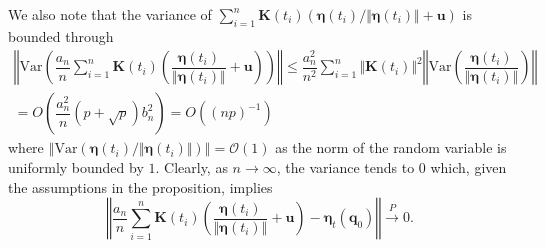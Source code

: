 \documentclass[aos]{imsart}
\theoremstyle{plain}
\theoremstyle{remark}
\newcommand{\bb}[1]{\boldsymbol{#1}}
\newcommand{\var}{\mathrm{Var}}
\newcommand{\cnam}[1]{\textcolor{mypurple}{#1}}
\begin{document}
We also note that the variance of $\sum_{i=1}^n \bb{K}(t_i) (\bb{\eta}(t_i)/\Vert \bb{\eta}(t_i)\Vert + \bb{u})$ is bounded through
\begin{multline*}
    \left\Vert \var\left( \dfrac{a_n}{n} \sum_{i=1}^n \bb{K}(t_i) \left( \dfrac{\bb{\eta}(t_i)}{\Vert \bb{\eta}(t_i) \Vert} + \bb{u}\right) \right) \right\Vert
    \leq \dfrac{a_n^2}{n^2} \sum_{i=1}^n \Vert \bb{K}(t_i)\Vert^2 \left\Vert \var\left( \dfrac{\bb{\eta}(t_i)}{\Vert \bb{\eta}(t_i) \Vert} \right) \right\Vert\\
    = O\left( \dfrac{a_n^2}{n} (p+\sqrt{p})b_n^2 \right)
    = O\left( (np)^{-1} \right)
\end{multline*}
\noindent where $\left\Vert \var\left( \bb{\eta}(t_i) / \Vert \bb{\eta}(t_i)\Vert \right) \right\Vert = \mathcal{O}(1)$ as the norm of the random variable is uniformly bounded by $1$. Clearly, as $n \rightarrow \infty$, the variance tends to $0$ \cnam{which, given the assumptions in the proposition, implies} 
\begin{equation*}
    \left\Vert \frac{a_n}{n} \sum_{i=1}^n \bb{K}(t_i) \left(\dfrac{\bb{\eta}(t_i)}{\Vert \bb{\eta}(t_i)\Vert} + \bb{u} \right) - \bb{\eta}_t(\bb{q}_0) \right\Vert \xrightarrow{P} 0.
\end{equation*}
\end{document}
